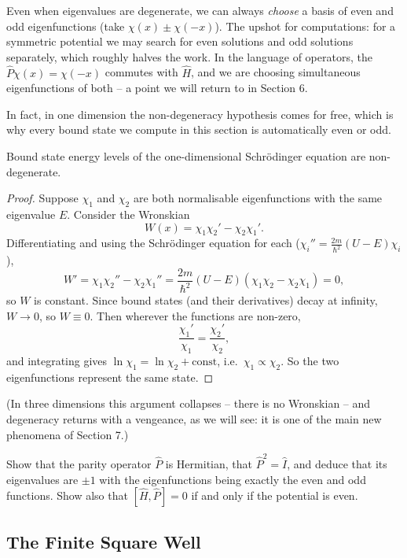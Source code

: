 \documentclass[a4paper]{scrartcl}
\begin{document}
Even when eigenvalues are degenerate, we can always \emph{choose} a basis of even and odd eigenfunctions (take $\chi(x) \pm \chi(-x)$). The upshot for computations: for a symmetric potential we may search for even solutions and odd solutions separately, which roughly halves the work. In the language of operators, the  $\hat{P} \chi(x) = \chi(-x)$ commutes with $\hat{H}$, and we are choosing simultaneous eigenfunctions of both -- a point we will return to in Section 6.

In fact, in one dimension the non-degeneracy hypothesis comes for free, which is why every bound state we compute in this section is automatically even or odd.

\begin{proposition}
    Bound state energy levels of the one-dimensional Schr\"odinger equation are non-degenerate.
\end{proposition}
\begin{proof}
    Suppose $\chi_1$ and $\chi_2$ are both normalisable eigenfunctions with the same eigenvalue $E$. Consider the Wronskian
    $$
    W(x) = \chi_1 \chi_2' - \chi_2 \chi_1'.
    $$
    Differentiating and using the Schr\"odinger equation for each ($\chi_i'' = \frac{2m}{\hbar^2}(U - E)\chi_i$),
    $$
    W' = \chi_1 \chi_2'' - \chi_2 \chi_1'' = \frac{2m}{\hbar^2}(U - E)(\chi_1 \chi_2 - \chi_2 \chi_1) = 0,
    $$
    so $W$ is constant. Since bound states (and their derivatives) decay at infinity, $W \rightarrow 0$, so $W \equiv 0$. Then wherever the functions are non-zero,
    $$
    \frac{\chi_1'}{\chi_1} = \frac{\chi_2'}{\chi_2},
    $$
    and integrating gives $\ln \chi_1 = \ln \chi_2 + \text{const}$, i.e.\ $\chi_1 \propto \chi_2$. So the two eigenfunctions represent the same state.
\end{proof}

(In three dimensions this argument collapses -- there is no Wronskian -- and degeneracy returns with a vengeance, as we will see: it is one of the main new phenomena of Section 7.)

\begin{exercise}
    Show that the parity operator $\hat{P}$ is Hermitian, that $\hat{P}^2 = \hat{I}$, and deduce that its eigenvalues are $\pm 1$ with the eigenfunctions being exactly the even and odd functions. Show also that $[\hat{H}, \hat{P}] = 0$ if and only if the potential is even.
\end{exercise}

\subsection{The Finite Square Well}
\end{document}
